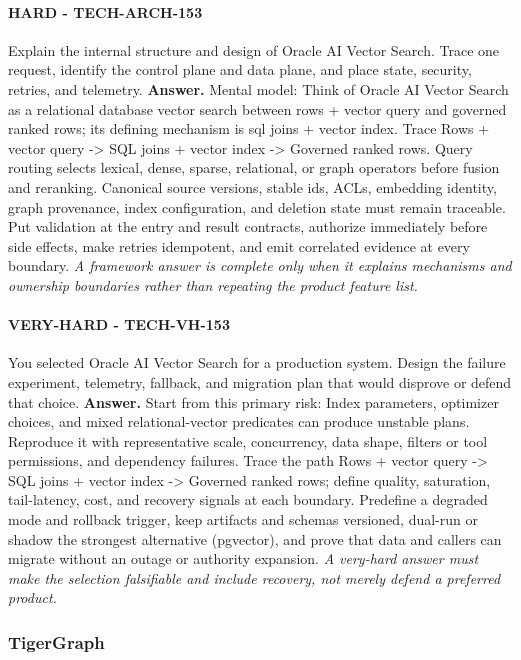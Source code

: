 \paragraph{HARD - TECH-ARCH-153} Explain the internal structure and design of Oracle AI Vector Search. Trace one request, identify the control plane and data plane, and place state, security, retries, and telemetry.
\textbf{Answer.} Mental model: Think of Oracle AI Vector Search as a relational database vector search between rows + vector query and governed ranked rows; its defining mechanism is sql joins + vector index. Trace Rows + vector query -> SQL joins + vector index -> Governed ranked rows. Query routing selects lexical, dense, sparse, relational, or graph operators before fusion and reranking. Canonical source versions, stable ids, ACLs, embedding identity, graph provenance, index configuration, and deletion state must remain traceable. Put validation at the entry and result contracts, authorize immediately before side effects, make retries idempotent, and emit correlated evidence at every boundary.
\textit{A framework answer is complete only when it explains mechanisms and ownership boundaries rather than repeating the product feature list.}
\paragraph{VERY-HARD - TECH-VH-153} You selected Oracle AI Vector Search for a production system. Design the failure experiment, telemetry, fallback, and migration plan that would disprove or defend that choice.
\textbf{Answer.} Start from this primary risk: Index parameters, optimizer choices, and mixed relational-vector predicates can produce unstable plans. Reproduce it with representative scale, concurrency, data shape, filters or tool permissions, and dependency failures. Trace the path Rows + vector query -> SQL joins + vector index -> Governed ranked rows; define quality, saturation, tail-latency, cost, and recovery signals at each boundary. Predefine a degraded mode and rollback trigger, keep artifacts and schemas versioned, dual-run or shadow the strongest alternative (pgvector), and prove that data and callers can migrate without an outage or authority expansion.
\textit{A very-hard answer must make the selection falsifiable and include recovery, not merely defend a preferred product.}
\subsubsection*{TigerGraph}
